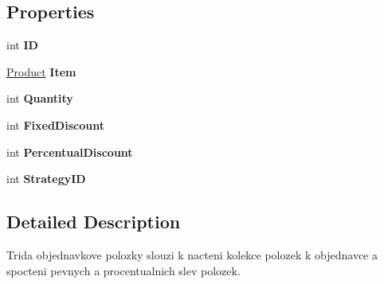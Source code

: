 \subsection*{Properties}
\begin{DoxyCompactItemize}
\item 
\mbox{\label{class_eshop_1_1_order_item_a4c700a61df0360ddf20db063c28fe928}} 
int {\bfseries ID}
\item 
\mbox{\label{class_eshop_1_1_order_item_a4257242dcff3e7f6bd22b21c4f0d79db}} 
\mbox{\hyperlink{class_eshop_1_1_product}{Product}} {\bfseries Item}
\item 
\mbox{\label{class_eshop_1_1_order_item_a1be7b3bdd044e407ec266b0a8751a6b0}} 
int {\bfseries Quantity}
\item 
\mbox{\label{class_eshop_1_1_order_item_a6fee26f6b432aaac8d75055224652e68}} 
int {\bfseries Fixed\+Discount}
\item 
\mbox{\label{class_eshop_1_1_order_item_a81902296a618544a26a1c52dfe47c769}} 
int {\bfseries Percentual\+Discount}
\item 
\mbox{\label{class_eshop_1_1_order_item_a7e59055b9e1f9d7a3ebf48d9a285d6d8}} 
int {\bfseries Strategy\+ID}
\end{DoxyCompactItemize}


\subsection{Detailed Description}
Trida objednavkove polozky slouzi k nacteni kolekce polozek k objednavce a spocteni pevnych a procentualnich slev polozek. 



